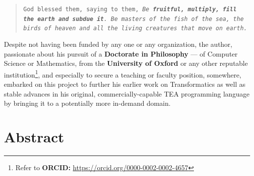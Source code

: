 \documentclass[a4paper, 18pt]{book} %
\begin{document}
\begin{quotation}
\noindent \texttt{God blessed them, saying to them, \textit{Be \textbf{fruitful, multiply, fill the earth and subdue it}. Be masters of the fish of the sea, the birds of heaven and all the living creatures that move on earth.}}\\
\end{quotation}


Despite not having been funded by any one or any organization, the author, passionate about his pursuit of a \textbf{Doctorate in Philosophy} --- of Computer Science or Mathematics, from the \textbf{University of Oxford}\cite{lutalo_2025_sop}\cite{Lutalo2025_phd} or any other reputable institution\footnote{Refer to \textbf{ORCID:} \url{https://orcid.org/0000-0002-0002-4657}}, and especially to secure a teaching or faculty position, somewhere, embarked on this project to further his earlier work on Transformatics\cite{transformatics} as well as stable advances in his original, commercially-capable TEA programming language\cite{cli_tttt} by bringing it to a potentially more in-demand domain. 



\mainmatter

\chapter*{Abstract}
\large
\end{document}
